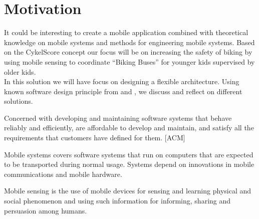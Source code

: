 \section{Motivation} It could be interesting to create a mobile application combined with theoretical knowledge on mobile systems and methods for engineering mobile systems. Based on the CykelScore concept our focus will be on increasing the safety of biking by using mobile sensing to coordinate “Biking Buses” for younger kids supervised by older kids.   \\

\noindent
 In this solution we will have focus on designing a flexible architecture. Using known software design principle from \cite{Bass} and \cite{Baerbak10}, we discuss and reflect on different solutions.
 
 
\begin{defi}
Concerned with developing and maintaining software systems that behave reliably and efficiently, are affordable to develop and maintain,
and satisfy all the requirements that customers have defined for them. [ACM]
\end{defi}


\begin{defi}
Mobile systems covers software systems that run on computers that are expected to be transported during normal usage. Systems depend on innovations in mobile
communications and mobile hardware.
\end{defi}


\begin{defi}
Mobile sensing is the use of mobile devices for sensing and learning physical and social phenomenon and using such information for
informing, sharing and persuasion among humans.
\end{defi}


